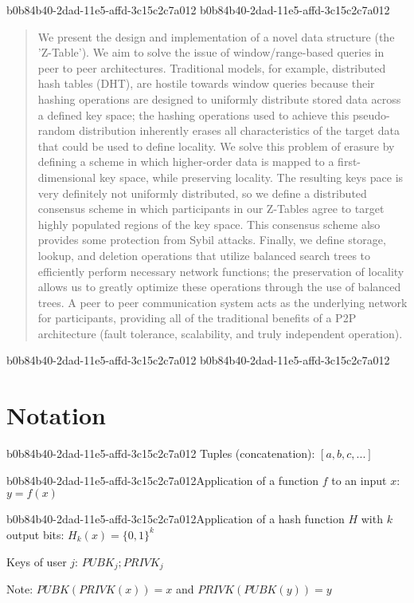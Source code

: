 \documentclass[12pt]{article}
\begin{document}
\maketitle
b0b84b40-2dad-11e5-affd-3c15c2c7a012
b0b84b40-2dad-11e5-affd-3c15c2c7a012\begin{abstract}
We present the design and implementation of a novel data structure (the 'Z-Table'). We aim to solve the issue of window/range-based queries in peer to peer architectures. Traditional models, for example,  distributed hash tables (DHT), are hostile towards window queries because their hashing operations are designed to uniformly distribute stored data across a defined key space; the hashing operations used to achieve this pseudo-random distribution inherently erases all characteristics of the target data that could be used to define locality. We solve this problem of erasure by defining a scheme in which higher-order data is mapped to a first-dimensional key space, while preserving locality. The resulting keys pace is very definitely not uniformly distributed, so we define a distributed consensus scheme in which participants in our Z-Tables agree to target highly populated regions of the key space. This consensus scheme also provides some protection from Sybil attacks. Finally, we define storage, lookup, and deletion operations that utilize balanced search trees to efficiently perform necessary network functions; the preservation of locality allows us to greatly optimize these operations through the use of balanced trees. A peer to peer communication system acts as the underlying network for participants, providing all of the traditional benefits of a P2P architecture (fault tolerance, scalability, and truly independent operation).
\end{abstract}
b0b84b40-2dad-11e5-affd-3c15c2c7a012
b0b84b40-2dad-11e5-affd-3c15c2c7a012\section{Notation}
b0b84b40-2dad-11e5-affd-3c15c2c7a012
Tuples (concatenation): $[a,b,c,...]$

b0b84b40-2dad-11e5-affd-3c15c2c7a012Application of a function $f$ to an input $x$: $y=f(x)$

b0b84b40-2dad-11e5-affd-3c15c2c7a012Application of a hash function $H$ with $k$ output bits: $H_{k}(x) = \{0,1\}^k$

Keys of user $j$: $ PUBK_j; PRIVK_j $

Note: $PUBK(PRIVK(x)) = x$ and $PRIVK(PUBK(y)) = y$~
\end{document}
